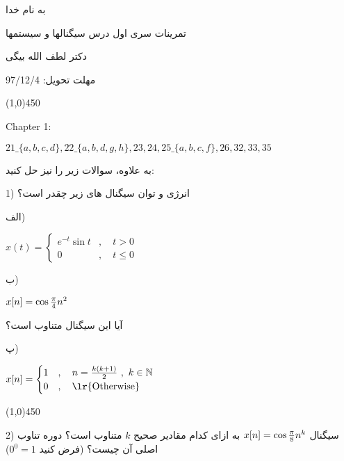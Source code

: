 \documentclass[50pt]{article}
\newcommand{\hl}{
\begin{center}
\line(1,0){450}
\end{center}}
\begin{document}
\setLTR 




\begin{RTL}
\Large{








\begin{center}
به نام خدا

تمرینات سری اول درس سیگنالها و سیستمها

دکتر لطف الله بیگی

مهلت تحویل: 97/12/4
\end{center}

\hl
\begin{latin}
Chapter 1:

$21\_\{a,b,c,d\} , 22\_\{a,b,d,g,h\} , 23 , 24 , 25\_\{a,b,c,f\} , 26 , 32 , 33 , 35$
\end{latin}
به علاوه، سوالات زیر را نیز حل کنید:

1) انرژی و توان سیگنال های زیر چقدر است؟

الف)

\begin{latin}
$x(t)=\begin{cases}e^{-t}\sin t&,\quad t>0\\0&,\quad t\le 0\end{cases}$
\end{latin}


ب)
\begin{latin}
$x[n]=\cos{\pi \over 4} n^2$
\end{latin}

آیا این سیگنال متناوب است؟


پ)



\begin{latin}
$x[n]=\begin{cases}1&,\quad n={k(k+1)\over 2}\ , \ k\in \Bbb N\\0 &,\quad \text{\lr{Otherwise}}\end{cases}$
\end{latin}



\hl
2) سیگنال 
$x[n]=\cos {\pi \over 8} n^k$
به ازای کدام مقادیر صحیح $k$ متناوب است؟ دوره تناوب اصلی آن چیست؟ (فرض کنید $0^0=1$)





}





\end{RTL}
\end{document}
